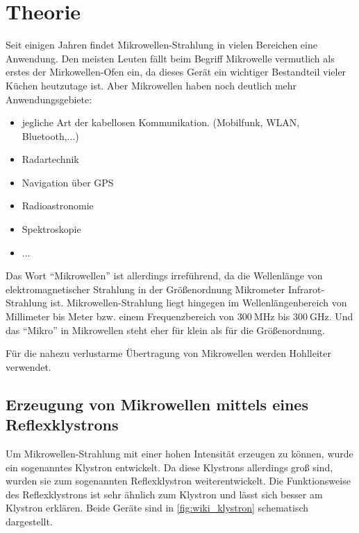 \section{Theorie}
\label{sec:Theorie}

Seit einigen Jahren findet Mikrowellen-Strahlung in vielen Bereichen eine Anwendung. 
Den meisten Leuten fällt beim Begriff Mikrowelle vermutlich als erstes der Mirkowellen-Ofen ein,
da dieses Gerät ein wichtiger Bestandteil vieler Küchen heutzutage ist.
Aber Mikrowellen haben noch deutlich mehr Anwendungsgebiete:
\begin{itemize}
    \item jegliche Art der kabellosen Kommunikation. (Mobilfunk, WLAN, Bluetooth,...)
    \item Radartechnik
    \item Navigation über GPS
    \item Radioastronomie
    \item Spektroskopie
    \item ...
\end{itemize}

Das Wort \enquote{Mikrowellen} ist allerdings irreführend, da die Wellenlänge von elektromagnetischer Strahlung in der Größenordnung Mikrometer 
Infrarot-Strahlung ist.
Mikrowellen-Strahlung liegt hingegen im Wellenlängenbereich von Millimeter bis Meter bzw. einem Frequenzbereich von $\SI{300}{\mega\hertz}$ bis $\SI{300}{\giga\hertz}$.
Und das \enquote{Mikro} in Mikrowellen steht eher für klein als für die Größenordnung.

Für die nahezu verlustarme Übertragung von Mikrowellen werden Hohlleiter verwendet.

\subsection{Erzeugung von Mikrowellen mittels eines Reflexklystrons}
\label{ssec:Erzeugung}

Um Mikrowellen-Strahlung mit einer hohen Intensität erzeugen zu können, wurde ein sogenanntes Klystron entwickelt.
Da diese Klystrons allerdings groß sind, wurden sie zum sogenannten Reflexklystron weiterentwickelt.
Die Funktionsweise des Reflexklystrons ist sehr ähnlich zum Klystron und lässt sich besser am Klystron erklären.
Beide Geräte sind in \autoref{fig:wiki_klystron} schematisch dargestellt.

